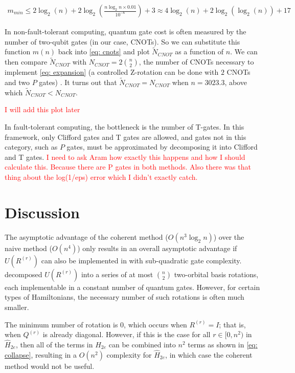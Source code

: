 \begin{equation}
    \begin{split}
        m_{min} \leq 2\log_2(n) + 2\log_2\left(\frac{n\log_2{n}\times 0.01}{10^{-6}}\right) + 3 \approx 4\log_2(n) + 2\log_2(\log_2(n)) + 17
    \end{split}
\end{equation}

In non-fault-tolerant computing, quantum gate cost is often measured by the number of two-qubit gates (in our case, CNOTs). So we can substitute this function $m(n)$ back into \eqref{eq: cnots} and plot $\tilde{N}_{CNOT}$ as a function of $n$. We can then compare $\tilde{N}_{CNOT}$ with $N_{CNOT} = 2{n \choose 2}$, the number of CNOTs necessary to implement \eqref{eq: expansion} (a controlled Z-rotation can be done with $2$ CNOTs and two $P$ gates) \cite{gates}. It turns out that $\tilde{N}_{CNOT} = N_{CNOT}$ when $n = 3023.3$, above which $\tilde{N}_{CNOT} < N_{CNOT}$.

\textcolor{red}{I will add this plot later}

In fault-tolerant computing, the bottleneck is the number of T-gates. In this framework, only Clifford gates and T gates are allowed, and gates not in this category, such as $P$ gates, must be approximated by decomposing it into Clifford and T gates. \textcolor{red}{I need to ask Aram how exactly this happens and how I should calculate this. Because there are P gates in both methods. Also there was that thing about the log(1/eps) error which I didn't exactly catch.}




\section{Discussion}

The asymptotic advantage of the coherent method ($O(n^3\log_2{n})$) over the naive method ($O(n^4)$) only results in an overall asymptotic advantage if $U(R^{(r)})$ can also be implemented in with sub-quadratic gate complexity. \cite{FSN} decomposed $U(R^{(r)})$ into a series of at most ${n \choose 2}$ two-orbital basis rotations, each implementable in a constant number of quantum gates. However, for certain types of Hamiltonians, the necessary number of such rotations is often much smaller.

The minimum number of rotation is $0$, which occurs when $R^{(r)} = I$; that is, when $Q^{(r)}$ is already diagonal. However, if this is the case for all $r \in [0, n^2)$ in $\hat{H}_{2e}$, then all of the terms in $\hat{H}_{2e}$ can be combined into $n^2$ terms as shown in \eqref{eq: collapse}, resulting in a $O(n^2)$ complexity for $\hat{H}_{2e}$, in which case the coherent method would not be useful.

